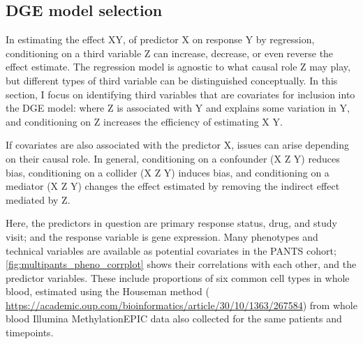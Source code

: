\begin{outline}
\subsection{DGE model selection}

\1 In estimating the effect X\textrightarrow Y, of predictor X on response Y by regression, 
conditioning on a third variable Z can increase, decrease, or even reverse the effect estimate.
The regression model is agnostic to what causal role Z may play,
but different types of third variable can be distinguished conceptually.
In this section, I focus on identifying third variables that are covariates for inclusion into the \gls{DGE} model:
where Z is associated with Y and explains some variation in Y,
and conditioning on Z increases the efficiency of estimating X \textrightarrow Y.

\1 If covariates are also associated with the predictor X, issues can arise depending on their causal role.
In general,
conditioning on a confounder (X \textleftarrow Z \textrightarrow Y) reduces bias,
conditioning on a collider (X \textrightarrow Z \textleftarrow Y) induces bias,
and conditioning on a mediator (X \textrightarrow Z \textrightarrow Y) changes the effect estimated by removing the indirect effect mediated by Z.

\1 Here, the predictors in question are primary response status, drug, and study visit; and the response variable is gene expression.
\1 Many phenotypes and technical variables are available as potential covariates in the \gls{PANTS} cohort;
\autoref{fig:multipants_pheno_corrplot} shows their correlations with each other, and the predictor variables.
These include proportions of six common cell types in whole blood, 
estimated using the Houseman method ( \url{https://academic.oup.com/bioinformatics/article/30/10/1363/267584}) 
from whole blood Illumina MethylationEPIC data also collected for the same patients and timepoints.


\end{outline}
